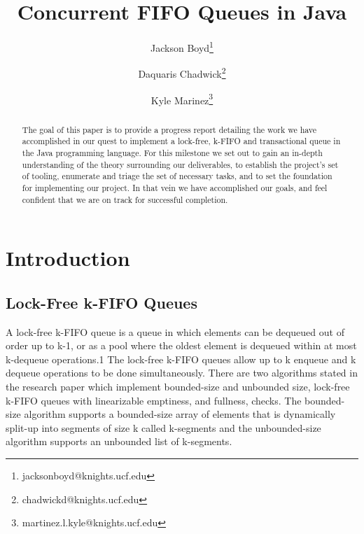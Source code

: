 \documentclass[a4paper, 10pt, conference]{ieeeconf}      %
\begin{document}
\title{Concurrent FIFO Queues in Java}
\author{Jackson Boyd\thanks{jacksonboyd@knights.ucf.edu}}
\author{Daquaris Chadwick\thanks{chadwickd@knights.ucf.edu}}
\author{Kyle Marinez\thanks{martinez.l.kyle@knights.ucf.edu}}

\maketitle
\begin{abstract}
The goal of this paper is to provide a progress report detailing the work we have accomplished in our quest to implement a lock-free, k-FIFO and transactional queue in the Java programming language. For this milestone we set out to gain an in-depth understanding of the theory surrounding our deliverables, to establish the project’s set of tooling, enumerate and triage the set of necessary tasks, and to set the foundation for implementing our project. In that vein we have accomplished our goals, and feel confident that we are on track for successful completion.  
\end{abstract}

\section{Introduction}
\subsection{Lock-Free k-FIFO Queues}
A lock-free k-FIFO queue is a queue in which elements can be dequeued out of order up to k-1, or as a pool where the oldest element is dequeued within at most k-dequeue operations.1 The lock-free k-FIFO queues allow up to k enqueue and k dequeue operations to be done simultaneously. There are two algorithms stated in the research paper which implement bounded-size and unbounded size, lock-free k-FIFO queues with linearizable emptiness, and fullness, checks. The bounded-size algorithm supports a bounded-size array of elements that is dynamically split-up into segments of size k called k-segments and the unbounded-size algorithm supports an unbounded list of k-segments.   
\end{document}
